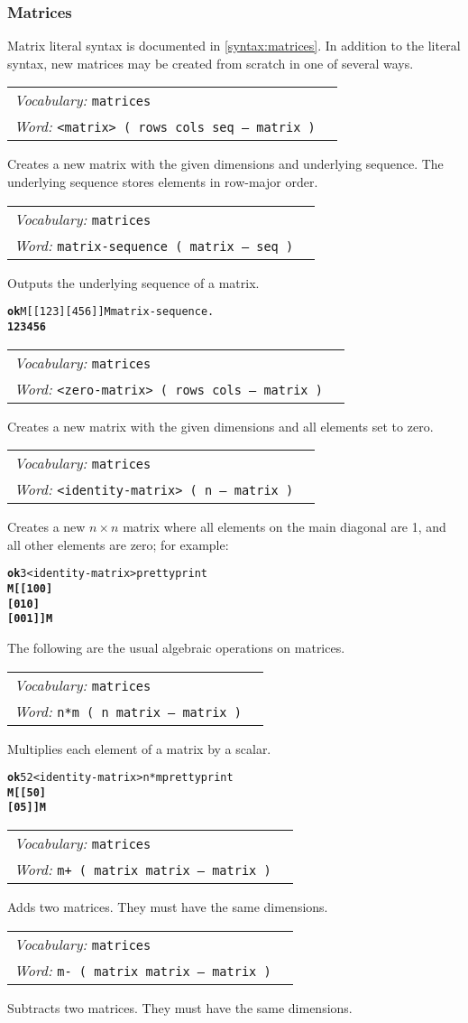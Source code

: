 \documentclass{book}
\newcommand{\tto}{\symbol{123}}
\newcommand{\ttc}{\symbol{125}}
\newcommand{\vocabulary}[1]{\emph{Vocabulary:} \texttt{#1}&\\}
\newcommand{\ordinaryword}[2]{\index{\texttt{#1}}\emph{Word:} \texttt{#2}&\\}
\newcommand{\wordtable}[1]{


\begin{tabularx}{12cm}{lX}
\hline
#1
\hline
\end{tabularx}

}
\begin{document}
\subsubsection{Matrices}\label{matrices}

Matrix literal syntax is documented in \ref{syntax:matrices}. In addition to the literal syntax, new matrices may be created from scratch in one of several ways.

\wordtable{
\vocabulary{matrices}
\ordinaryword{<matrix>}{<matrix> ( rows cols seq -- matrix )}
}
Creates a new matrix with the given dimensions and underlying sequence. The underlying sequence stores elements in row-major order.

\wordtable{
\vocabulary{matrices}
\ordinaryword{matrix-sequence}{matrix-sequence ( matrix -- seq )}
}
Outputs the underlying sequence of a matrix.

\begin{alltt}
\textbf{ok} M[ [ 1 2 3 ] [ 4 5 6 ] ]M matrix-sequence .
\textbf{\tto 1 2 3 4 5 6 \ttc}
\end{alltt}

\wordtable{
\vocabulary{matrices}
\ordinaryword{<zero-matrix>}{<zero-matrix> ( rows cols -- matrix )}
}
Creates a new matrix with the given dimensions and all elements set to zero.

\wordtable{
\vocabulary{matrices}
\ordinaryword{<identity-matrix>}{<identity-matrix> ( n -- matrix )}
}
Creates a new $n\times n$ matrix where all elements on the main diagonal are 1, and all other elements are zero; for example:

\begin{alltt}
\textbf{ok} 3 <identity-matrix> prettyprint
\textbf{M[ [ 1 0 0 ]
   [ 0 1 0 ]
   [ 0 0 1 ] ]M}
\end{alltt}

The following are the usual algebraic operations on matrices.

\wordtable{
\vocabulary{matrices}
\ordinaryword{n*m}{n*m ( n matrix -- matrix )}
}
Multiplies each element of a matrix by a scalar.
\begin{alltt}
\textbf{ok} 5 2 <identity-matrix> n*m prettyprint
\textbf{M[ [ 5 0 ]
   [ 0 5 ] ]M}
\end{alltt}

\wordtable{
\vocabulary{matrices}
\ordinaryword{m+}{m+~( matrix matrix -- matrix )}
}
Adds two matrices. They must have the same dimensions.

\wordtable{
\vocabulary{matrices}
\ordinaryword{m-}{m-~( matrix matrix -- matrix )}
}
Subtracts two matrices. They must have the same dimensions.
\end{document}
